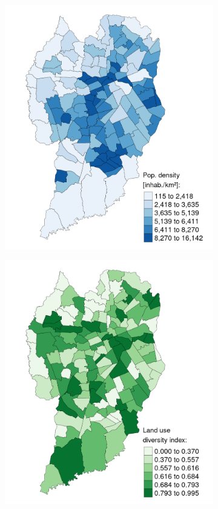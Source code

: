 \begin{figure}[!htbp]
    \centering\footnotesize
    \captionsetup{font=footnotesize}
    \caption{PD AND LDI}
    \begin{subfigure}{0.5\textwidth}
        \includegraphics{fig/map_PD.png}
    \end{subfigure}%
    \begin{subfigure}{0.5\textwidth}
        \includegraphics{fig/map_LDI.png}

\end{subfigure}
\end{figure}

